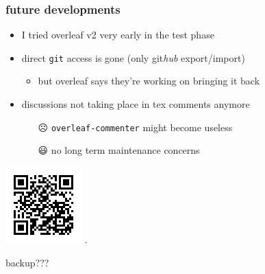 \begin{frame}
  \frametitle{future developments}
  \begin{itemize}
    \item I tried overleaf v2 very early in the test phase
    \item direct \texttt{git} access is gone (only git\emph{hub} export/import)
      \begin{itemize}
        \item but overleaf says they're working on bringing it back
      \end{itemize}
    \item discussions not taking place in tex comments anymore
      \begin{itemize}
        \item[{\DejaSans ☹}] \texttt{overleaf-commenter} might become useless
        \item[{\DejaSans 😃}] no long term maintenance concerns
      \end{itemize}
  \end{itemize}

  \includegraphics[width=.3\textwidth]{./QR2.png}
  .
\end{frame}

\appendix

\begin{frame}
  {\Huge{backup???}}

  {}
\end{frame}

